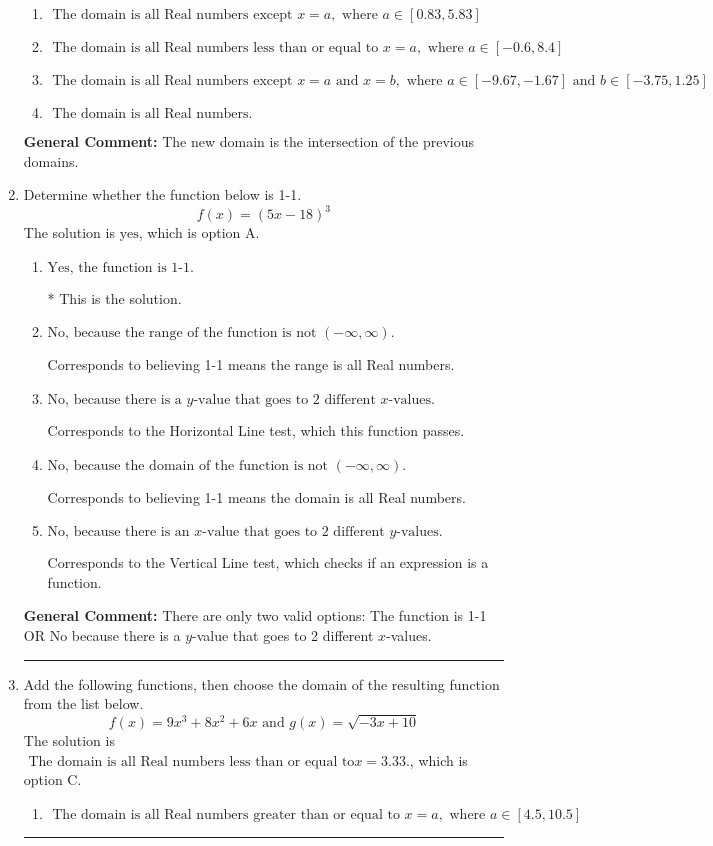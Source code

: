 \documentclass{extbook}[14pt]
\newcommand{\litem}[1]{\item #1

\rule{\textwidth}{0.4pt}}
\begin{document}
\begin{enumerate}
{\begin{enumerate}[label=\Alph*.]
\item \( \text{ The domain is all Real numbers except } x = a, \text{ where } a \in [0.83, 5.83] \)


\item \( \text{ The domain is all Real numbers less than or equal to } x = a, \text{ where } a \in [-0.6, 8.4] \)


\item \( \text{ The domain is all Real numbers except } x = a \text{ and } x = b, \text{ where } a \in [-9.67, -1.67] \text{ and } b \in [-3.75, 1.25] \)


\item \( \text{ The domain is all Real numbers. } \)


\end{enumerate}

\textbf{General Comment:} The new domain is the intersection of the previous domains.
}
\litem{
Determine whether the function below is 1-1.
\[ f(x) = (5 x - 18)^3 \]The solution is \( \text{yes} \), which is option A.\begin{enumerate}[label=\Alph*.]
\item \( \text{Yes, the function is 1-1.} \)

* This is the solution.
\item \( \text{No, because the range of the function is not $(-\infty, \infty)$.} \)

Corresponds to believing 1-1 means the range is all Real numbers.
\item \( \text{No, because there is a $y$-value that goes to 2 different $x$-values.} \)

Corresponds to the Horizontal Line test, which this function passes.
\item \( \text{No, because the domain of the function is not $(-\infty, \infty)$.} \)

Corresponds to believing 1-1 means the domain is all Real numbers.
\item \( \text{No, because there is an $x$-value that goes to 2 different $y$-values.} \)

Corresponds to the Vertical Line test, which checks if an expression is a function.
\end{enumerate}

\textbf{General Comment:} There are only two valid options: The function is 1-1 OR No because there is a $y$-value that goes to 2 different $x$-values.
}
\litem{
Add the following functions, then choose the domain of the resulting function from the list below.
\[ f(x) = 9x^{3} +8 x^{2} +6 x \text{ and } g(x) = \sqrt{-3x+10}  \]The solution is \( \text{ The domain is all Real numbers less than or equal to} x = 3.33. \), which is option C.\begin{enumerate}[label=\Alph*.]
\item \( \text{ The domain is all Real numbers greater than or equal to } x = a, \text{ where } a \in [4.5, 10.5] \)



\end{enumerate}}
\end{enumerate}
\end{document}
